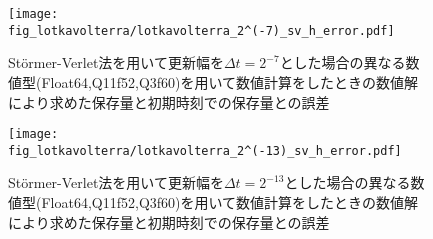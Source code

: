 \begin{figure}[H]
    \centering
    \begin{minipage}[b]{0.49\columnwidth}
        \centering
        \texttt{[image: fig\_lotkavolterra/lotkavolterra\_2^(-7)\_sv\_h\_error.pdf]}
        \caption{St\"ormer-Verlet法を用いて更新幅を$\Delta t = 2^{-7}$とした場合の異なる数値型(Float64,Q11f52,Q3f60)を用いて数値計算をしたときの数値解により求めた保存量と初期時刻での保存量との誤差}
        \label{fig:lotkavolterra_2^(-7)_sv_h_error}
    \end{minipage}
    \begin{minipage}[b]{0.49\columnwidth}
        \centering
        \texttt{[image: fig\_lotkavolterra/lotkavolterra\_2^(-13)\_sv\_h\_error.pdf]}
        \caption{St\"ormer-Verlet法を用いて更新幅を$\Delta t =  2^{-13}$とした場合の異なる数値型(Float64,Q11f52,Q3f60)を用いて数値計算をしたときの数値解により求めた保存量と初期時刻での保存量との誤差}
        \label{fig:lotkavolterra_2^(-13)_sv_h_error}
    \end{minipage}
\end{figure}